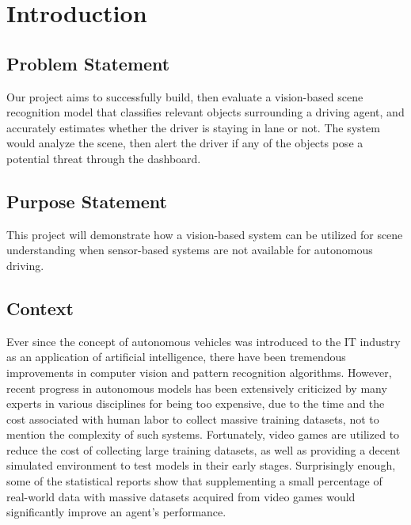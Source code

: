 \chapter{Introduction}

\section{Problem Statement} 

Our project aims to successfully build, then evaluate a vision-based scene recognition model that classifies relevant objects surrounding a driving agent, and accurately estimates whether the driver is staying in lane or not. The system would analyze the scene, then alert the driver if any of the objects pose a potential threat through the dashboard.




\section{Purpose Statement} 

This project will demonstrate how a vision-based system can be utilized for scene understanding when sensor-based systems are not available for autonomous driving.




\section{Context} 

Ever since the concept of autonomous vehicles was introduced to the IT industry as an application of artificial intelligence, there have been tremendous improvements in computer vision and pattern recognition algorithms. However, recent progress in autonomous models has been extensively criticized by many experts in various disciplines for being too expensive, due to the time and the cost associated with human labor to collect massive training datasets, not to mention the complexity of such systems. Fortunately, video games are utilized to reduce the cost of collecting large training datasets, as well as providing a decent simulated environment to test models in their early stages. Surprisingly enough, some of the statistical reports show that supplementing a small percentage of real-world data with massive datasets acquired from video games would significantly improve an agent’s performance. 

